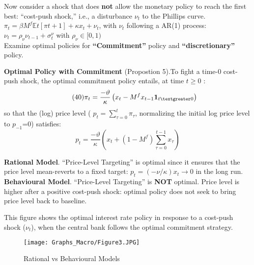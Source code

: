 \documentclass{beamer}
\begin{document}
\begin{frame}{\subsecname}
    Now consider a shock that does \textbf{not} allow the monetary policy to reach the first best: “cost-push shock,” i.e., a disturbance $\nu_{t}$ to the Phillips curve.\\
    \hfill \linebreak
    $\pi_{t}=\beta M^{f} \mathbb{E}t\left[\pi{t+1}\right]+\kappa x_{t}+\nu_{t}$, with $\nu_{t}$ following a AR(1) process: $\nu_{t}=\rho_{\nu}\nu_{t-1}+\sigma_{t}^{\nu}$ with $\rho_{\nu}\in[0,1)$\\
    \hfill \linebreak
    Examine optimal policies for \textbf{``Commitment''} policy and \textbf{``discretionary''} policy.
\end{frame}

\begin{frame}{\subsecname}
    \textbf{Optimal Policy with Commitment} (Propostion 5).To fight a time-0 cost-push shock, the optimal commitment policy entails, at time $t \geq 0$ :
    \begin{equation}\tag{40}
        \pi_{t}=\frac{-\vartheta}{\kappa}\left(x_{t}-M^{f}x_{t-1}\textbf{1}_{t\textgreater 0}\right)
    \end{equation}
    so that the (log) price level ( $p_{t}=\sum\limits_{\tau=0}^{t}\pi_{\tau}$, normalizing the initial log price level to $p_{-1}$=0) satisfies:
    \begin{equation}\tag{41}
        p_{t}=\frac{-\vartheta}{\kappa}\left(x_{t}+\left(1-M^{f}\right)\sum_{\tau=0}^{t-1}x_{\tau}\right)
    \end{equation}
\end{frame}

\begin{frame}{\subsecname}
    \textbf{Rational Model}. “Price-Level Targeting” is optimal since it ensures that the price level mean-reverts to a fixed target: $p_{t}=(-\nu/\kappa)x_{t}\to0$ in the long run.\\
    \hfill \linebreak    
    \textbf{Behavioural Model}. “Price-Level Targeting” is \textbf{NOT} optimal. Price level is higher after a positive cost-push shock: optimal policy does not seek to bring price level back to baseline.\\    
\end{frame}

\begin{frame}{\subsecname}
    This figure shows the optimal interest rate policy in response to a cost-push shock ($\nu_{t}$), when the central bank follows the optimal commitment strategy.    
    \begin{figure}
        \centering
        \texttt{[image: Graphs\_Macro/Figure3.JPG]}
        \caption{Rational vs Behavioural Models}
        \label{fig:3}
    \end{figure}
\end{frame}
\end{document}
